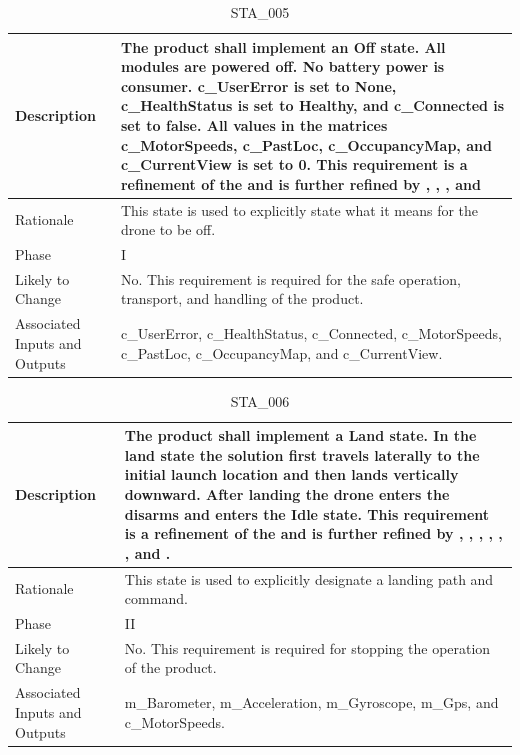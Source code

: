 \documentclass{article}
\begin{document}
\begin{table}[!h]
\begin{center}
\caption {STA\_005} 
\label{STA_005}
\begin{tabular}{ | m{3cm} | m{11cm} | }
\hline
Description & The product shall implement an Off state.  All modules are powered off. No battery power is consumer. c\_UserError is set to None, c\_HealthStatus is set to Healthy, and c\_Connected is set to false. All values in the matrices c\_MotorSpeeds, c\_PastLoc, c\_OccupancyMap, and c\_CurrentView is set to 0. This requirement is a refinement of the \nameref{Off State} and is further refined by \nameref{PERF_004}, \nameref{PERF_007}, \nameref{SAFE_001}, and \nameref{SAFE_003} \\
\hline
Rationale & This state is used to explicitly state what it means for the drone to be off. \\
\hline
Phase & I \\
\hline
Likely to Change & No. This requirement is required for the safe operation, transport, and handling of the product. \\
\hline
Associated Inputs and Outputs & c\_UserError, c\_HealthStatus, c\_Connected, c\_MotorSpeeds, c\_PastLoc, c\_OccupancyMap, and c\_CurrentView. \\
\hline
\end{tabular}
\end{center}
\end{table}

\begin{table}[!h]
\begin{center}
\caption {STA\_006} 
\label{STA_006}
\begin{tabular}{ | m{3cm} | m{11cm} | }
\hline
Description & The product shall implement a Land state. In the land state the solution first travels laterally to the initial launch location and then lands vertically downward. After landing the drone enters the disarms and enters the Idle state. This requirement is a refinement of the \nameref{Land State} and is further refined by \nameref{PERF_002}, \nameref{PERF_004}, \nameref{PERF_006}, \nameref{PERF_007}, \nameref{SAFE_001}, \nameref{SAFE_003}, and \nameref{USE_003}. \\
\hline
Rationale & This state is used to explicitly designate a landing path and command. \\
\hline
Phase & II \\
\hline
Likely to Change & No. This requirement is required for stopping the operation of the product. \\
\hline
Associated Inputs and Outputs & m\_Barometer, m\_Acceleration, m\_Gyroscope, m\_Gps, and c\_MotorSpeeds. \\
\hline
\end{tabular}
\end{center}
\end{table}
\end{document}
